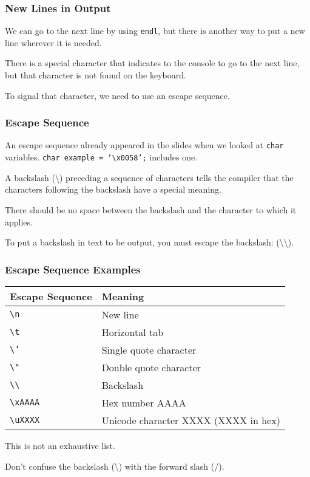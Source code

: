 \begin{frame}
\frametitle{New Lines in Output}
We can go to the next line by using \texttt{endl}, but there is another way to put a new line wherever it is needed.

There is a special character that indicates to the console to go to the next line, but that character is not found on the keyboard.

To signal that character, we need to use an \alert{escape sequence}.

\end{frame}

\begin{frame}
\frametitle{Escape Sequence}
An escape sequence already appeared in the slides when we looked at \texttt{char} variables. \texttt{char example = '\textbackslash x0058';} includes one.

A backslash (\textbackslash) preceding a sequence of characters tells the compiler that the characters following the backslash have a special meaning.

There should be no space between the backslash and the character to which it applies.

To put a backslash in text to be output, you must escape the backslash: (\textbackslash\textbackslash).

\end{frame}

\begin{frame}
\frametitle{Escape Sequence Examples}
\begin{center}
\begin{tabular}{l|l}
	\textbf{Escape Sequence} & \textbf{Meaning} \\ \hline
	\texttt{\textbackslash n} & New line \\ \hline
	\texttt{\textbackslash t} & Horizontal tab \\ \hline
	\texttt{\textbackslash '} & Single quote character \\ \hline
	\texttt{\textbackslash "} & Double quote character \\ \hline
	\texttt{\textbackslash\textbackslash} & Backslash \\ \hline
	\texttt{\textbackslash xAAAA} & Hex number AAAA \\ \hline
	\texttt{\textbackslash uXXXX} & Unicode character XXXX (XXXX in hex)\\
	
\end{tabular}
\end{center}

This is not an exhaustive list.

Don't confuse the backslash (\textbackslash) with the forward slash (/).

\end{frame}

